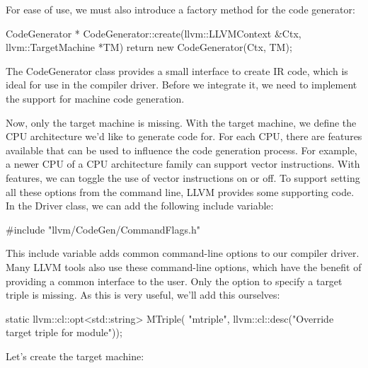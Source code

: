 For ease of use, we must also introduce a factory method for the code generator:

\begin{cpp}
CodeGenerator *
CodeGenerator::create(llvm::LLVMContext &Ctx,
                      llvm::TargetMachine *TM) {
    return new CodeGenerator(Ctx, TM);
}
\end{cpp}

The CodeGenerator class provides a small interface to create IR code, which is ideal for use in the compiler driver. Before we integrate it, we need to implement the support for machine code generation.


Now, only the target machine is missing. With the target machine, we define the CPU architecture we’d like to generate code for. For each CPU, there are features available that can be used to influence the code generation process. For example, a newer CPU of a CPU architecture family can support vector instructions. With features, we can toggle the use of vector instructions on or off. To support setting all these options from the command line, LLVM provides some supporting code. In the Driver class, we can add the following include variable:

\begin{cpp}
#include "llvm/CodeGen/CommandFlags.h"
\end{cpp}

This include variable adds common command-line options to our compiler driver. Many LLVM tools also use these command-line options, which have the benefit of providing a common interface to the user. Only the option to specify a target triple is missing. As this is very useful, we’ll add this ourselves:

\begin{cpp}
static llvm::cl::opt<std::string> MTriple(
    "mtriple",
    llvm::cl::desc("Override target triple for module"));
\end{cpp}

Let’s create the target machine:

